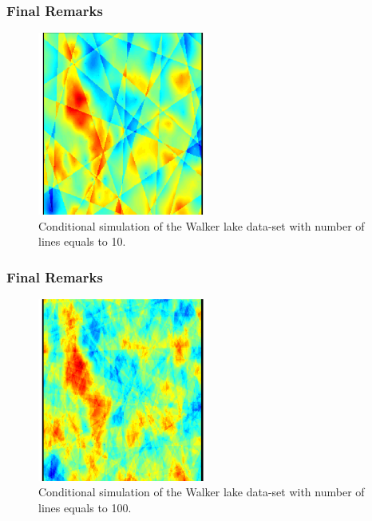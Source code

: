 \documentclass{beamer}
\begin{document}
\begin{frame}
 \frametitle{Final Remarks}
 
\begin{figure}
\begin{center}
\includegraphics[width=0.5\textwidth]{walker_lake_tb_n=10.pdf}
\end{center}
\caption{Conditional simulation of the Walker lake data-set with number of lines equals to 10.}
\label{fig:gaussian_unc_simulation}
\end{figure}
\end{frame}

\begin{frame}
 \frametitle{Final Remarks}
\begin{figure}
\begin{center}
\includegraphics[width=0.5\textwidth]{walker_lake_tb_n=100.pdf}
\end{center}
\caption{Conditional simulation of the Walker lake data-set with number of lines equals to 100.}
\label{fig:gaussian_unc_simulation}
\end{figure}
\end{frame}
\end{document}

